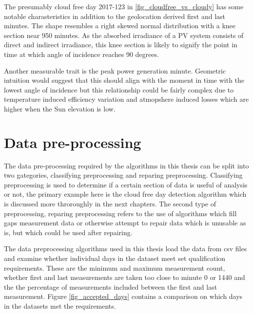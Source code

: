 \noindent The presumably cloud free day 2017-123 in \ref{fig_cloudfree_vs_cloudy} has some notable charasteristics in addition to the geolocation derived first and last minutes. The shape resembles a right skewed normal distribution with a knee section near 950 minutes. As the absorbed irradiance of a PV system consists of direct and indirect irradiance, this knee section is likely to signify the point in time at which angle of incidence reaches 90 degrees.

Another measurable trait is the peak power generation minute. Geometric intuition would suggest that this should align with the moment in time with the lowest angle of incidence but this relationship could be fairly complex due to temperature induced efficiency variation and atmopshere induced losses which are higher when the Sun elevation is low.





\newpage
\section{Data pre-processing}
The data pre-processing required by the algorithms in this thesis can be split into two gategories, classifying preprocessing and reparing preprocessing. Classifying preprocessing is used to determine if a certain section of data is useful of analysis or not, the primary example here is the cloud free day detection algorithm which is discussed more throroughly in the next chapters. The second type of preprocessing, reparing preprocessing refers to the use of algorithms which fill gaps measurement data or otherwise attempt to repair data which is unusable as is, but which could be used after repairing.

The data preprocessing algorithms used in this thesis load the data from csv files and examine whether individual days in the dataset meet set qualification requirements. These are the minimum and maximum measurement count, whether first and last measurements are taken too close to minute 0 or 1440 and the the percentage of measurements included between the first and last measurement. Figure \ref{fig_accepted_days} contains a comparison on which days in the datasets met the requirements.


